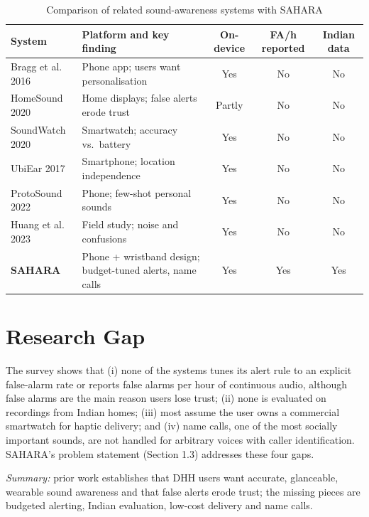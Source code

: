 \documentclass[12pt,a4paper,oneside]{report}
\begin{document}
\begin{table}[h]
\caption{Comparison of related sound-awareness systems with SAHARA}
\label{tab:litcomp}
\centering\small
\begin{tabularx}{\textwidth}{@{}lXccc@{}}
\toprule
System & Platform and key finding & On-device & FA/h reported & Indian data\\
\midrule
Bragg et al. 2016 \cite{bragg2016} & Phone app; users want personalisation & Yes & No & No\\
HomeSound 2020 \cite{jain2020homesound} & Home displays; false alerts erode trust & Partly & No & No\\
SoundWatch 2020 \cite{jain2020soundwatch} & Smartwatch; accuracy vs.\ battery & Yes & No & No\\
UbiEar 2017 \cite{liu2017ubiear} & Smartphone; location independence & Yes & No & No\\
ProtoSound 2022 \cite{jain2022protosound} & Phone; few-shot personal sounds & Yes & No & No\\
Huang et al. 2023 \cite{huang2023} & Field study; noise and confusions & Yes & No & No\\
\textbf{SAHARA} & Phone + wristband design; budget-tuned alerts, name calls & Yes & Yes & Yes\\
\bottomrule
\end{tabularx}
\end{table}

\section{Research Gap}
The survey shows that (i) none of the systems tunes its alert rule to an explicit false-alarm rate or reports false alarms per hour of continuous audio, although false alarms are the main reason users lose trust; (ii) none is evaluated on recordings from Indian homes; (iii) most assume the user owns a commercial smartwatch for haptic delivery; and (iv) name calls, one of the most socially important sounds, are not handled for arbitrary voices with caller identification. SAHARA's problem statement (Section 1.3) addresses these four gaps.

\textit{Summary:} prior work establishes that DHH users want accurate, glanceable, wearable sound awareness and that false alerts erode trust; the missing pieces are budgeted alerting, Indian evaluation, low-cost delivery and name calls.

\end{document}
